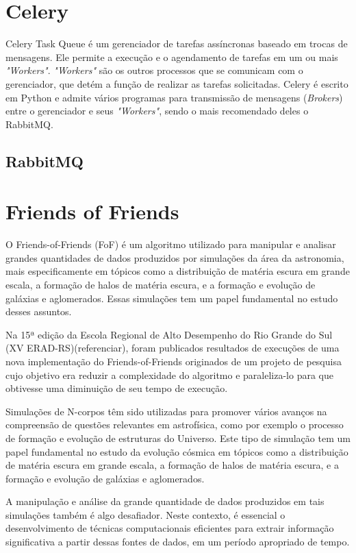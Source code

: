 \documentclass[tg]{mdtufsm}
\begin{document}
\section{Celery}
Celery Task Queue é um gerenciador de tarefas assíncronas baseado em trocas de mensagens. Ele permite a execução e o agendamento de tarefas em um ou mais \emph{"Workers"}. \emph{"Workers"} são os outros processos que se comunicam com o gerenciador, que detém a função de realizar as tarefas solicitadas. Celery é escrito em Python e admite vários programas para transmissão de mensagens (\emph{Brokers}) entre o gerenciador e seus \emph{"Workers"}, sendo o mais recomendado deles o RabbitMQ.

\subsection{RabbitMQ}


\section{Friends of Friends}
O Friends-of-Friends (FoF) é um algoritmo utilizado para manipular e analisar grandes quantidades de dados produzidos por simulações da área da astronomia, mais especificamente em tópicos como a distribuição de matéria escura em grande escala, a formação de halos de matéria escura, e a formação e evolução de galáxias e aglomerados. Essas simulações tem um papel fundamental\cite{Bertschinger,Efstathiou} no estudo desses assuntos.

Na 15ª edição da Escola Regional de Alto Desempenho do Rio Grande do Sul (XV ERAD-RS)(referenciar), foram publicados resultados de execuções de uma nova implementação do Friends-of-Friends\cite{friends} originados de um projeto de pesquisa cujo objetivo era reduzir a complexidade do algoritmo e paraleliza-lo para que obtivesse uma diminuição de seu tempo de execução.

\iffalse
Simulações de N-corpos têm sido utilizadas para promover vários avanços na compreensão de questões relevantes em astrofísica, como por exemplo o processo de formação e evolução de estruturas do Universo. Este tipo de simulação tem um papel fundamental\cite{Bertschinger,Efstathiou} no estudo da evolução cósmica em tópicos como a distribuição de matéria escura em grande escala, a formação de halos de matéria escura, e a formação e evolução de galáxias e aglomerados.

A manipulação e análise da grande quantidade de dados produzidos em tais simulações também é algo desafiador.
Neste contexto, é essencial o desenvolvimento de técnicas computacionais eficientes para extrair informação
significativa a partir dessas fontes de dados, em um período apropriado de tempo.
\end{document}
